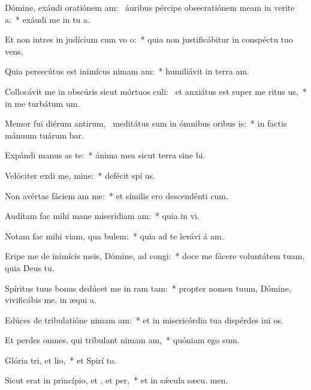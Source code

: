 \item Dómine, exáudi oratiónem am:~\pscross{} áuribus pércipe obsecratiónem meam in verite a:~* exáudi me in tu a.
\item Et non intres in judícium cum vo o:~* quia non justificábitur in conspéctu tuo  vens.
\item Quia persecútus est inimícus nimam am:~* humiliávit in terra  am.
\item Collocávit me in obscúris sicut mórtuos culi:~\pscross{} et anxiátus est super me ritus us,~* in me turbátum   um.
\item Memor fui diérum antirum,~\pscross{} meditátus sum in ómnibus oribus is:~* in factis mánuum tuárum bar.
\item Expándi manus as  te:~* ánima mea sicut terra sine  bi.
\item Velóciter exdi me, mine:~* defécit spí us.
\item Non avértas fáciem am  me:~* et símilis ero descendénti  cum.
\item Audítam fac mihi mane miseridiam am:~* quia in  vi.
\item Notam fac mihi viam,  qua bulem:~* quia ad te levávi á am.
\item Eripe me de inimícis meis, Dómine, ad  congi:~* doce me fácere voluntátem tuam, quia Deus   tu.
\item Spíritus tuus bonus dedúcet me in ram tam:~* propter nomen tuum, Dómine, vivificábis me, in æqui a.
\item Edúces de tribulatióne nimam am:~* et in misericórdia tua dispérdes ini os.
\item Et perdes omnes, qui tríbulant nimam am,~* quóniam ego   sum.
\item Glória tri, et lio,~* et Spirí to.
\item Sicut erat in princípio, et , et per,~* et in sǽcula sæcu. men.
